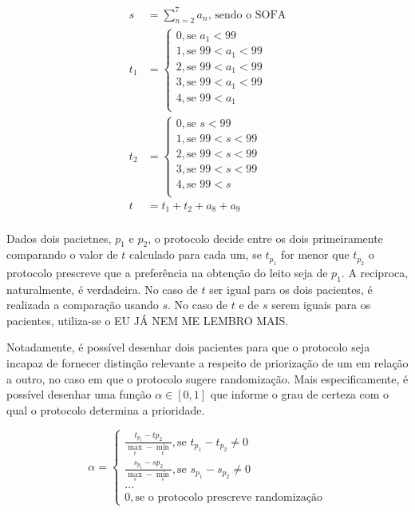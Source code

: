 \documentclass[12pt]{article}
\begin{document}
\[
\begin{split}
    s &= \sum_{n=2}^{7} a_n\text{, sendo o SOFA} \\
    t_1 &=  \begin{cases}
        0, \text{se } a_1 < 99 \\
        1, \text{se } 99 < a_1 < 99 \\
        2, \text{se } 99 < a_1 < 99 \\
        3, \text{se } 99 < a_1 < 99 \\
        4, \text{se } 99 < a_1 \\
    \end{cases} \\
    t_2 &= \begin{cases}
        0, \text{se } s < 99 \\
        1, \text{se } 99 < s < 99 \\
        2, \text{se } 99 < s < 99 \\
        3, \text{se } 99 < s < 99 \\
        4, \text{se } 99 < s \\
    \end{cases} \\
    t &= t_1 + t_2 + a_8 + a_9 \\ %
\end{split}
\] 

Dados dois pacietnes, $p_1$ e $p_2$, o protocolo decide entre os dois primeiramente comparando o valor de $t$ calculado para cada um, se  $t_{p_1}$ for menor que $t_{p_2}$ o protocolo prescreve que a preferência na obtenção do leito seja de  $p_1.$
A reciproca, naturalmente, é verdadeira.
No caso de $t$ ser igual para os dois pacientes, é realizada a comparação usando  $s$. 
No caso de $t$ e de  $s$ serem iguais para os pacientes, utiliza-se o EU JÁ NEM ME LEMBRO MAIS.

Notadamente, é possível desenhar dois pacientes para que o protocolo seja incapaz de fornecer distinção relevante a respeito de priorização de um em relação a outro, no caso em que o protocolo sugere randomização.
Mais especificamente, é possível desenhar uma função $\alpha \in [0, 1]$ que informe o grau de certeza com o qual o protocolo determina a prioridade.

\[
\alpha = \begin{cases}
    \frac{t_{p_1} - t{p_2}}{\max_t - \min_t}, \text{se } t_{p_1} - t_{p_2} \neq 0 \\
    \frac{s_{p_1} - s{p_2}}{\max_s - \min_s}, \text{se } s_{p_1} - s_{p_2} \neq 0 \\
    \ldots \\
    0, \text{se o protocolo prescreve randomização}
\end{cases}
\] 
\end{document}

